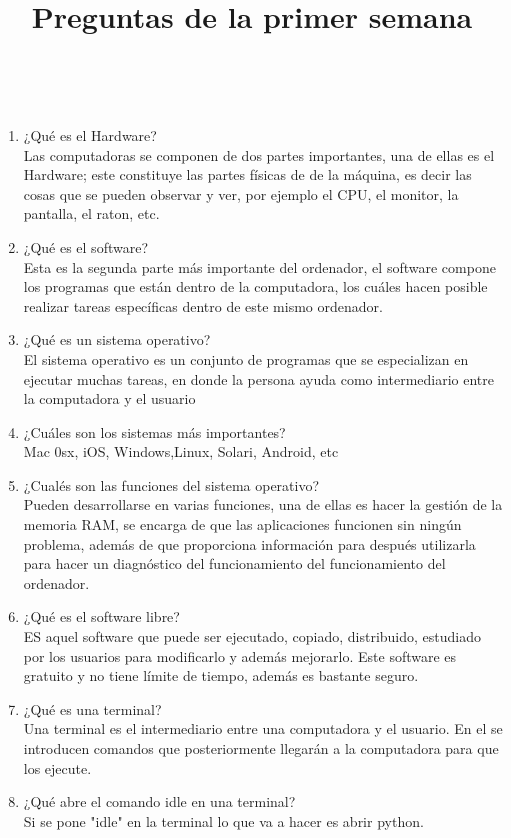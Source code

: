 \documentclass[letterpaper, 12pt, oneside]{article}%
\begin{document}
	\newpage
	\title{\huge Preguntas de la primer semana}\\
	\begin{enumerate}
		\item 
		¿Qué es el Hardware?\\
		Las computadoras se componen de dos partes importantes, una de ellas es el Hardware; este constituye las partes físicas de de la máquina, es decir las cosas que se pueden observar y ver, por ejemplo el CPU, el monitor, la pantalla, el raton, etc.
		\item 
		¿Qué es el software?\\
		Esta es la segunda parte más importante del ordenador, el software compone los programas que están dentro de la computadora, los cuáles hacen posible realizar tareas específicas dentro de este mismo ordenador. 
		\item 
		¿Qué es un sistema operativo?\\
		El sistema operativo es un conjunto de programas que se especializan en ejecutar muchas tareas, en donde la persona ayuda como intermediario entre la computadora y el usuario
		\item 
		¿Cuáles son los sistemas más importantes?\\
		Mac 0sx, iOS, Windows,Linux, Solari, Android, etc
		\item 
		¿Cualés son las funciones del sistema operativo?\\
		Pueden desarrollarse en varias funciones, una de ellas es hacer la gestión de la memoria RAM, se encarga de que las aplicaciones funcionen sin ningún problema, además de que proporciona información para después utilizarla para hacer un diagnóstico del funcionamiento del funcionamiento del ordenador.
		\item 
		¿Qué es el software libre?\\
		ES aquel software que puede ser ejecutado, copiado, distribuido, estudiado por los usuarios para modificarlo y además mejorarlo.
		Este software es gratuito y no tiene límite de tiempo, además es bastante seguro.
		\item 
		¿Qué es una terminal?\\
		Una terminal es el intermediario entre una computadora y el usuario. En el se introducen comandos que posteriormente llegarán a la computadora para que los ejecute.
		\item
		¿Qué abre el comando idle en una terminal?\\
		Si se pone "idle" en la terminal lo que va a hacer es abrir python.

\end{enumerate}
\end{document}
